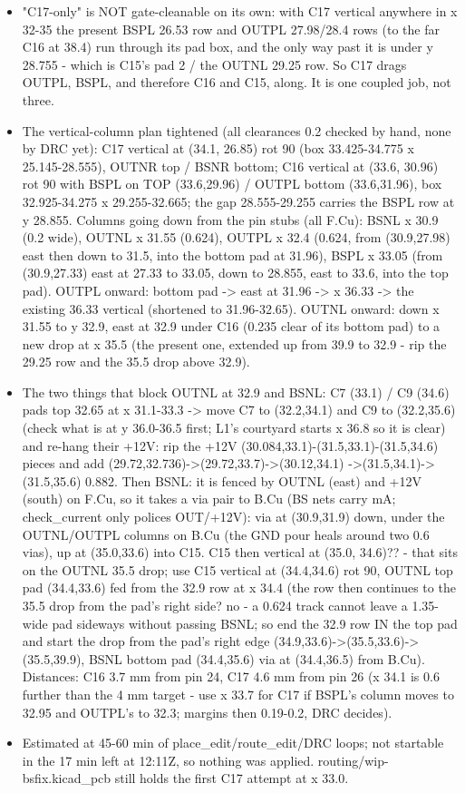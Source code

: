 \documentclass[11pt]{article}
\begin{document}
\begin{itemize}
\item "C17-only" is NOT gate-cleanable on its own: with C17 vertical anywhere in x 32-35 the present
BSPL 26.53 row and OUTPL 27.98/28.4 rows (to the far C16 at 38.4) run through its pad box, and
the only way past it is under y 28.755 - which is C15's pad 2 / the OUTNL 29.25 row. So C17
drags OUTPL, BSPL, and therefore C16 and C15, along. It is one coupled job, not three.
\item The vertical-column plan tightened (all clearances 0.2 checked by hand, none by DRC yet):
C17 vertical at (34.1, 26.85) rot 90 (box 33.425-34.775 x 25.145-28.555), OUTNR top / BSNR bottom;
C16 vertical at (33.6, 30.96) rot 90 with BSPL on TOP (33.6,29.96) / OUTPL bottom (33.6,31.96),
box 32.925-34.275 x 29.255-32.665; the gap 28.555-29.255 carries the BSPL row at y 28.855.
Columns going down from the pin stubs (all F.Cu): BSNL x 30.9 (0.2 wide), OUTNL x 31.55 (0.624),
OUTPL x 32.4 (0.624, from (30.9,27.98) east then down to 31.5, into the bottom pad at 31.96),
BSPL x 33.05 (from (30.9,27.33) east at 27.33 to 33.05, down to 28.855, east to 33.6, into the
top pad). OUTPL onward: bottom pad -\textgreater{} east at 31.96 -\textgreater{} x 36.33 -\textgreater{} the existing 36.33 vertical
(shortened to 31.96-32.65). OUTNL onward: down x 31.55 to y 32.9, east at 32.9 under C16
(0.235 clear of its bottom pad) to a new drop at x 35.5 (the present one, extended up from 39.9
to 32.9 - rip the 29.25 row and the 35.5 drop above 32.9).
\item The two things that block OUTNL at 32.9 and BSNL: C7 (33.1) / C9 (34.6) pads top 32.65 at
x 31.1-33.3 -\textgreater{} move C7 to (32.2,34.1) and C9 to (32.2,35.6) (check what is at y 36.0-36.5
first; L1's courtyard starts x 36.8 so it is clear) and re-hang their +12V: rip the +12V
(30.084,33.1)-(31.5,33.1)-(31.5,34.6) pieces and add (29.72,32.736)-\textgreater{}(29.72,33.7)-\textgreater{}(30.12,34.1)
-\textgreater{}(31.5,34.1)-\textgreater{}(31.5,35.6) 0.882. Then BSNL: it is fenced by OUTNL (east) and +12V (south) on
F.Cu, so it takes a via pair to B.Cu (BS nets carry mA; check\_current only polices OUT/+12V):
via at (30.9,31.9) down, under the OUTNL/OUTPL columns on B.Cu (the GND pour heals around two
0.6 vias), up at (35.0,33.6) into C15. C15 then vertical at (35.0, 34.6)?? - that sits on the
OUTNL 35.5 drop; use C15 vertical at (34.4,34.6) rot 90, OUTNL top pad (34.4,33.6) fed from the
32.9 row at x 34.4 (the row then continues to the 35.5 drop from the pad's right side? no - a
0.624 track cannot leave a 1.35-wide pad sideways without passing BSNL; so end the 32.9 row IN
the top pad and start the drop from the pad's right edge (34.9,33.6)-\textgreater{}(35.5,33.6)-\textgreater{}(35.5,39.9),
BSNL bottom pad (34.4,35.6) via at (34.4,36.5) from B.Cu). Distances: C16 3.7 mm from pin 24,
C17 4.6 mm from pin 26 (x 34.1 is 0.6 further than the 4 mm target - use x 33.7 for C17 if
BSPL's column moves to 32.95 and OUTPL's to 32.3; margins then 0.19-0.2, DRC decides).
\item Estimated at 45-60 min of place\_edit/route\_edit/DRC loops; not startable in the 17 min left at 12:11Z,
so nothing was applied. routing/wip-bsfix.kicad\_pcb still holds the first C17 attempt at x 33.0.
\end{itemize}
\end{document}
